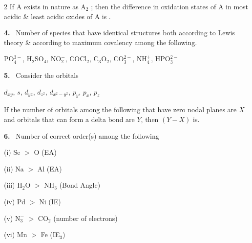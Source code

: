 \documentclass[10pt]{extarticle}
\newcommand{\qn}[1]{\par\smallskip\noindent\textbf{#1.}~}
\begin{document}
\begin{multicols}{2}
If A exists in nature as A$_2$ ; then the difference in oxidation states of A in most acidic \& least acidic oxides of A is \underline{\hspace{1cm}}.
\qn{4} Number of species that have identical structures both according to Lewis theory \& according to maximum covalency among the following.

PO$_4^{3-}$, H$_2$SO$_4$, NO$_2^-$, COCl$_2$, C$_3$O$_2$, CO$_3^{2-}$, NH$_4^+$, HPO$_3^{2-}$
\qn{5} Consider the orbitals

$d_{xy}$, $s$, $d_{yz}$, $d_{z^2}$, $d_{x^2-y^2}$, $p_y$, $p_x$, $p_z$

If the number of orbitals among the following that have zero nodal planes are $X$ and orbitals that can form a delta bond are $Y$, then $(Y-X)$ is.
\qn{6} Number of correct order(s) among the following

(i) Se $>$ O (EA)

(ii) Na $>$ Al (EA)

(iii) H$_2$O $>$ NH$_3$ (Bond Angle)

(iv) Pd $>$ Ni (IE)

(v) N$_3^-$ $>$ CO$_2$ (number of electrons)

(vi) Mn $>$ Fe (IE$_3$)


\end{multicols}
\end{document}
